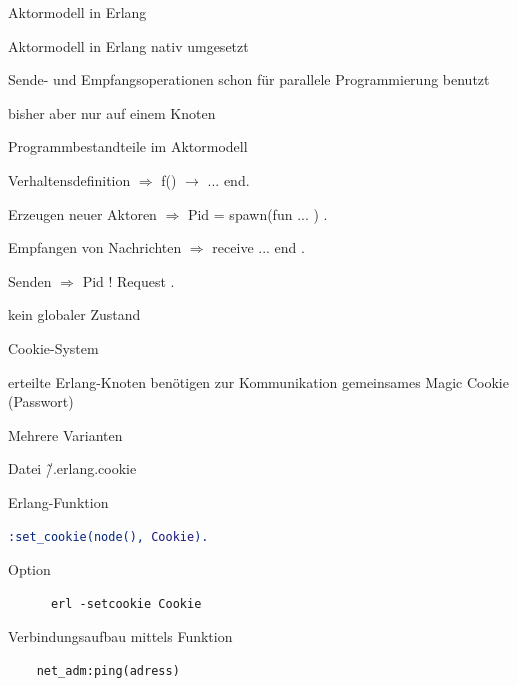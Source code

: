 \documentclass[10pt]{article}
\begin{document}
  Aktormodell in Erlang
  \begin{itemize*}
    \item Aktormodell in Erlang nativ umgesetzt
    \begin{itemize*}
      \item Sende- und Empfangsoperationen schon für parallele Programmierung benutzt
      \item bisher aber nur auf einem Knoten
    \end{itemize*}
    \item Programmbestandteile im Aktormodell
    \begin{itemize*}
      \item Verhaltensdefinition $\Rightarrow$ f() $\rightarrow$ ... end.
      \item Erzeugen neuer Aktoren $\Rightarrow$ Pid = spawn(fun ... ) .
      \item Empfangen von Nachrichten $\Rightarrow$ receive ... end .
      \item Senden $\Rightarrow$ Pid ! Request .
    \end{itemize*}
    \item kein globaler Zustand
  \end{itemize*}
  
  Cookie-System
  \begin{itemize*}
    \item erteilte Erlang-Knoten benötigen zur Kommunikation gemeinsames Magic Cookie (Passwort)
    \item Mehrere Varianten
    \begin{itemize*}
      \item Datei \~/.erlang.cookie
      \item Erlang-Funktion
      \begin{lstlisting}[language=erlang]
      :set_cookie(node(), Cookie).
      \end{lstlisting}
      \item Option
      \begin{lstlisting}
      erl -setcookie Cookie
      \end{lstlisting}
    \end{itemize*}
    \item Verbindungsaufbau mittels Funktion
    \begin{lstlisting}
    net_adm:ping(adress)
    \end{lstlisting}
  \end{itemize*}
  
\end{document}
